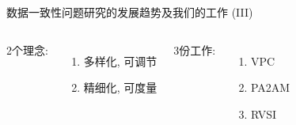 \begin{frame}{数据一致性问题研究的发展趋势及我们的工作 (III)}
  \begin{columns}[t]
	  2个理念:
	  \begin{enumerate}
		\item 多样化, 可调节
		\item 精细化, 可度量
	  \end{enumerate}
      3份工作:
	  \begin{enumerate}
		\item VPC
		\item PA2AM
		\item RVSI
	  \end{enumerate}
  \end{columns}
\end{frame}
